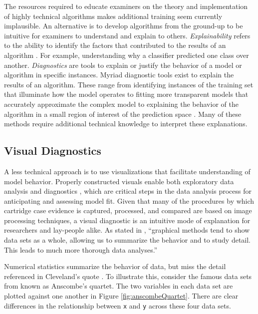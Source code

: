 \documentclass[11pt,]{isuthesis}
\begin{document}
The resources required to educate examiners on the theory and implementation of highly technical algorithms makes additional training seem currently implausible.
An alternative is to develop algorithms from the ground-up to be intuitive for examiners to understand and explain to others.
\emph{Explainability} refers to the ability to identify the factors that contributed to the results of an algorithm \citep{Belle2021PrinciplesAP}.
For example, understanding why a classifier predicted one class over another.
\emph{Diagnostics} are tools to explain or justify the behavior of a model or algorithm in specific instances.
Myriad diagnostic tools exist to explain the results of an algorithm.
These range from identifying instances of the training set that illuminate how the model operates \citep{Deng2018} to fitting more transparent models that accurately approximate the complex model \citep{Puiutta2020} to explaining the behavior of the algorithm in a small region of interest of the prediction space \citep{LIME,Goode2021}.
Many of these methods require additional technical knowledge to interpret these explanations.

\hypertarget{visual-diagnostics}{%
\subsection{Visual Diagnostics}\label{visual-diagnostics}}

A less technical approach is to use visualizations that facilitate understanding of model behavior.
Properly constructed visuals enable both exploratory data analysis and diagnostics \citep{Buja2009}, which are critical steps in the data analysis process for anticipating and assessing model fit.
Given that many of the procedures by which cartridge case evidence is captured, processed, and compared are based on image processing techniques, a visual diagnostic is an intuitive mode of explanation for researchers and lay-people alike.
As stated in \citet{cleveland1994elements}, ``graphical methods tend to show data sets as a whole, allowing us to summarize the behavior and to study detail. This leads to much more thorough data analyses.''

Numerical statistics summarize the behavior of data, but miss the detail referenced in Cleveland's quote \citep{telea2014data}.
To illustrate this, consider the famous data sets from \citep{Anscombe1973} known as Anscombe's quartet.
The two variables in each data set are plotted against one another in Figure \ref{fig:anscombeQuartet}.
There are clear differences in the relationship between \texttt{x} and \texttt{y} across these four data sets.
\end{document}
